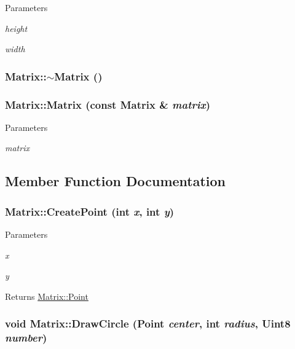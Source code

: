 \begin{DoxyParams}{Parameters}
\item[{\em height}]\item[{\em width}]\end{DoxyParams}
\hypertarget{classMatrix_a9b1c3627f573d78a2f08623fdfef990f}{
\subsubsection[{$\sim$Matrix}]{\setlength{\rightskip}{0pt plus 5cm}Matrix::$\sim$Matrix ()}}
\label{classMatrix_a9b1c3627f573d78a2f08623fdfef990f}
\hypertarget{classMatrix_a2b1fedfb1b076d4ae504d2c61019871f}{
\subsubsection[{Matrix}]{\setlength{\rightskip}{0pt plus 5cm}Matrix::Matrix (const {\bf Matrix} \& {\em matrix})}}
\label{classMatrix_a2b1fedfb1b076d4ae504d2c61019871f}

\begin{DoxyParams}{Parameters}
\item[{\em matrix}]\end{DoxyParams}


\subsection{Member Function Documentation}
\hypertarget{classMatrix_a39929c70aea7926beaf183b374239558}{
\subsubsection[{CreatePoint}]{ Matrix::CreatePoint (int {\em x}, \/  int {\em y})}}
\label{classMatrix_a39929c70aea7926beaf183b374239558}

\begin{DoxyParams}{Parameters}
\item[{\em x}]\item[{\em y}]\end{DoxyParams}
\begin{DoxyReturn}{Returns}
\hyperlink{structMatrix_1_1Point}{Matrix::Point} 
\end{DoxyReturn}
\hypertarget{classMatrix_a9dd7af97fcc825ca07a64b28050cb44f}{
\subsubsection[{DrawCircle}]{\setlength{\rightskip}{0pt plus 5cm}void Matrix::DrawCircle ({\bf Point} {\em center}, \/  int {\em radius}, \/  Uint8 {\em number})}}
\label{classMatrix_a9dd7af97fcc825ca07a64b28050cb44f}

